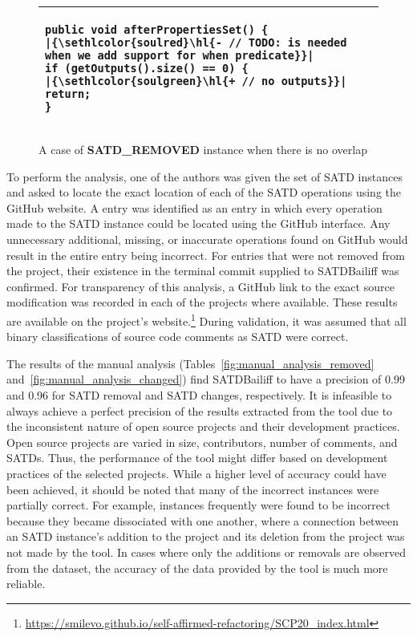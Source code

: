 \documentclass[3p]{elsarticle}
\newcommand{\approach}{SATDBailiff\xspace}
\DeclareRobustCommand{\hlremove}[1]{{\sethlcolor{soulred}\hl{#1}}}
\DeclareRobustCommand{\hladd}[1]{{\sethlcolor{soulgreen}\hl{#1}}}
\begin{document}
\begin{figure}
    \centering
    \begin{tabular}{|p{28em}|}
    \hline
        \begin{lstlisting}
public void afterPropertiesSet() {
|\hlremove{- // TODO: is needed when we add support for when predicate}|
if (getOutputs().size() == 0) {
|\hladd   {+ // no outputs}|
return;
}

        \end{lstlisting}
    \\\hline
    \end{tabular}
    \caption{A case of \textbf{SATD\_REMOVED} instance when there is no overlap}
    \label{fig:remove_entirelydifferent}  
\end{figure}




To perform the analysis, one of the authors was given the set of SATD instances and asked to locate the exact location of each of the SATD operations using the GitHub website. A  entry was identified as an entry in which every operation made to the SATD instance could be located using the GitHub interface. Any unnecessary additional, missing, or inaccurate operations found on GitHub would result in the entire entry being incorrect. For entries that were not removed from the project, their existence in the terminal commit supplied to \approach  was confirmed. For transparency of this analysis, a GitHub link to the exact source modification was recorded in each of the projects where available. These results are available on the project's website.\footnote{\url{https://smilevo.github.io/self-affirmed-refactoring/SCP20_index.html}} During validation, it was assumed that all binary classifications of source code comments as SATD were correct.

The results of the manual analysis (Tables~\ref{fig:manual_analysis_removed} and~\ref{fig:manual_analysis_changed}) find \approach  to have a precision of 0.99 and 0.96 for SATD removal and SATD changes, respectively. %
It is infeasible to always achieve a perfect precision of the results extracted from the tool due to the inconsistent nature of open source projects and their development practices. Open source projects are varied in size, contributors,  number of comments, and SATDs. Thus, the performance of the tool might differ based on development practices of the selected projects. While a higher level of accuracy could have been achieved, it should be noted that many of the incorrect instances were partially correct. For example, instances frequently were found to be incorrect because they became dissociated with one another, where a connection between an SATD instance's addition to the project and its deletion from the project was not made by the tool. In cases where only the additions or removals are observed from the dataset, the accuracy of the data provided by the tool is much more reliable.
\end{document}
